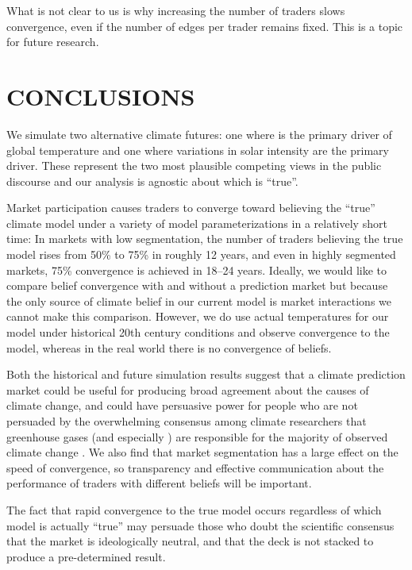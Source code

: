 \documentclass{wscpaperproc}\usepackage[]{graphicx}\usepackage[]{color}
\begin{document}
What is not clear to us is why increasing the number of traders slows convergence, even if the number of edges per trader remains fixed. This is a topic for future research.

\section{CONCLUSIONS}

We simulate two alternative climate futures: one where  is the primary driver of global temperature and one where variations in solar intensity are the primary driver. These represent the two most plausible competing views in the public discourse and our analysis is agnostic about which is ``true''.

Market participation causes traders to converge toward believing the ``true'' climate model under a variety of model parameterizations in a relatively short time: In markets with low segmentation, the number of traders believing the true model rises from 50\% to 75\% in roughly 12 years, and even in highly segmented markets, 75\% convergence is achieved in 18--24 years. Ideally, we would like to compare belief convergence with and without a prediction market but because the only source of climate belief in our current model is market interactions we cannot make this comparison. However, we do use actual temperatures for our model under historical 20th century conditions and observe convergence to the  model, whereas in the real world there is no convergence of beliefs.

Both the historical and future simulation results suggest that a climate prediction market could be useful for producing broad agreement about the causes of climate change, and could have persuasive power for people who are not persuaded by the overwhelming consensus among climate researchers that greenhouse gases (and especially ) are responsible for the majority of observed climate change . We also find that market segmentation has a large effect on the speed of convergence, so transparency and effective communication about the performance of traders with different beliefs will be important.

The fact that rapid convergence to the true model occurs regardless of which model is actually ``true'' may persuade those who doubt the scientific consensus that the market is ideologically neutral, and that the deck is not stacked to produce a pre-determined result.
\end{document}

